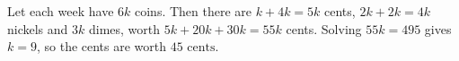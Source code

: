 Let each week have $6k$ coins. Then there are $k+4k=5k$ cents, $2k+2k=4k$ nickels and $3k$ dimes, worth $5k+20k+30k=55k$ cents. Solving $55k=495$ gives $k=9$, so the cents are worth $\boxed{45\text{ cents}}$.
